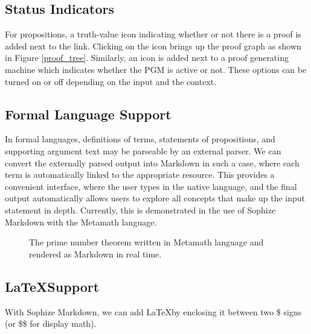 \documentclass[a4paper]{article}
\begin{document}
\subsection{Status Indicators}

For propositions, a truth-value icon indicating whether or not there is a proof is added next to the link. Clicking on the icon brings up the proof graph as shown in Figure \ref{proof_tree}. Similarly, an icon is added next to a proof generating machine which indicates whether the PGM is active or not. These options can be turned on or off depending on the input and the context. 

\subsection{Formal Language Support}

In formal languages, definitions of terms, statements of propositions, and supporting argument text may be parseable by an external parser. We can convert the externally parsed output into Markdown in such a case, where each term is automatically linked to the appropriate resource. This provides a convenient interface, where the user types in the native language, and the final output automatically allows users to explore all concepts that make up the input statement in depth. Currently, this is demonstrated in the use of Sophize Markdown with the Metamath language.

\begin{figure}[htbp]
\begin{center}
\caption{The prime number theorem written in Metamath language and rendered as Markdown in real time.}
\label{formal}
\end{center}
\end{figure}

\subsection{\LaTeX\space Support}

With Sophize Markdown, we can add \LaTeX\space by enclosing it between two \$ signs (or \$\$ for display math).
\end{document}
